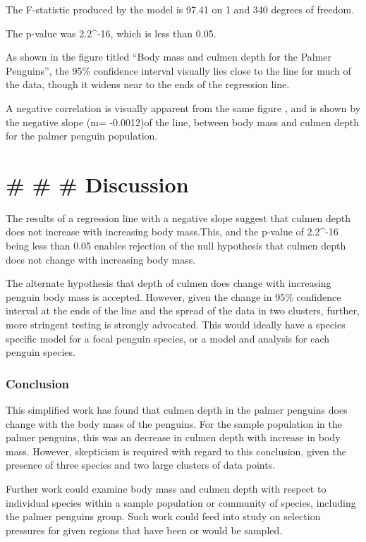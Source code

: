 \documentclass[
]{article}
\begin{document}
The F-statistic produced by the model is 97.41 on 1 and 340 degrees of
freedom.

The p-value was 2.2\^{}-16, which is less than 0.05.

As shown in the figure titled ``Body mass and culmen depth for the
Palmer Penguins'', the 95\% confidence interval visually lies close to
the line for much of the data, though it widens near to the ends of the
regression line.

A negative correlation is visually apparent from the same figure , and
is shown by the negative slope (m= -0.0012)of the line, between body
mass and culmen depth for the palmer penguin population.

\hypertarget{discussion}{%
\section{\# \# \# Discussion}\label{discussion}}

The results of a regression line with a negative slope suggest that
culmen depth does not increase with increasing body mass.This, and the
p-value of 2.2\^{}-16 being less than 0.05 enables rejection of the null
hypothesis that culmen depth does not change with increasing body mass.

The alternate hypothesis that depth of culmen does change with
increasing penguin body mass is accepted. However, given the change in
95\% confidence interval at the ends of the line and the spread of the
data in two clusters, further, more stringent testing is strongly
advocated. This would ideally have a species specific model for a focal
penguin species, or a model and analysis for each penguin species.

\hypertarget{conclusion}{%
\subsubsection{Conclusion}\label{conclusion}}

This simplified work has found that culmen depth in the palmer penguins
does change with the body mass of the penguins. For the sample
population in the palmer penguins, this was an decrease in culmen depth
with increase in body mass. However, skepticism is required with regard
to this conclusion, given the presence of three species and two large
clusters of data points.

Further work could examine body mass and culmen depth with respect to
individual species within a sample population or community of species,
including the palmer penguins group. Such work could feed into study on
selection pressures for given regions that have been or would be
sampled.
\end{document}
